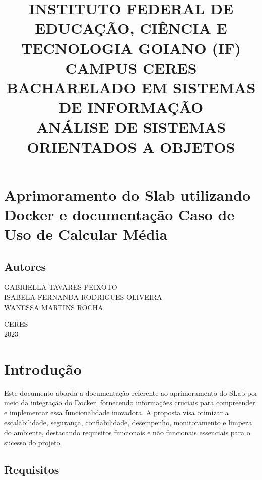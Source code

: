 \documentclass{article}
\begin{document}
\title{INSTITUTO FEDERAL DE EDUCAÇÃO, CIÊNCIA E TECNOLOGIA GOIANO (IF)\\ CAMPUS CERES\\ BACHARELADO EM SISTEMAS DE INFORMAÇÃO\\ANÁLISE DE SISTEMAS ORIENTADOS A OBJETOS}
\doublespacing
\date{}
\maketitle
\vspace{50pt}

\section*{Aprimoramento do Slab utilizando Docker e documentação Caso de Uso de Calcular Média}
\vspace{70pt}

\begin{center}
\large
\section*{Autores} 
 GABRIELLA TAVARES PEIXOTO\\
 ISABELA FERNANDA RODRIGUES OLIVEIRA\\
 WANESSA MARTINS ROCHA\\
 \vspace{90pt}
 
{CERES\\2023}
\vspace{70pt}

\tableofcontents
\end{center}
\vspace{500pt}

\section{Introdução}
{Este documento aborda a documentação referente ao aprimoramento do SLab por meio da integração do Docker, fornecendo informações cruciais para compreender e implementar essa funcionalidade inovadora. A proposta visa otimizar a escalabilidade, segurança, confiabilidade, desempenho, monitoramento e limpeza do ambiente, destacando requisitos funcionais e não funcionais essenciais para o sucesso do projeto.}
\vspace{10pt}

\subsection{Requisitos}
\vspace{10pt}
\end{document}
